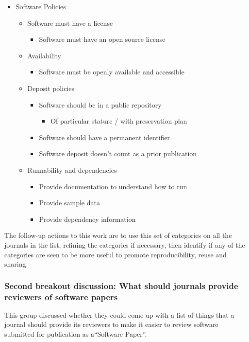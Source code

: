 \documentclass[11pt, oneside]{amsart}
\begin{document}
\begin{itemize}
\item Software Policies
\begin{itemize}
	\item Software must have a license
	\begin{itemize}
		\item Software must have an open source license
	\end{itemize}
	\item Availability
	\begin{itemize}
		\item Software must be openly available and accessible
	\end{itemize}
	\item Deposit policies
	\begin{itemize}
		\item Software should be in a public repository
		\begin{itemize}
			\item Of particular stature / with preservation plan
		\end{itemize}
		\item Software should have a permanent identifier
		\item Software deposit doesn't count as a prior publication
	\end{itemize}
	\item Runnability and dependencies
	\begin{itemize}
		\item Provide documentation to understand how to run
		\item Provide sample data
		\item Provide dependency information
	\end{itemize}
\end{itemize}
\end{itemize}

The follow-up actions to this work are to use this set of categories on all the journals in the list, refining the categories if necessary, then identify if any of the categories are seen to be more useful to promote reproducibility, reuse and sharing.

\subsubsection{Second breakout discussion: What should journals provide reviewers of software papers}

This group discussed whether they could come up with a list of things that a journal should provide its reviewers to make it easier to review software submitted for publication as a``Software Paper''.
\end{document}
